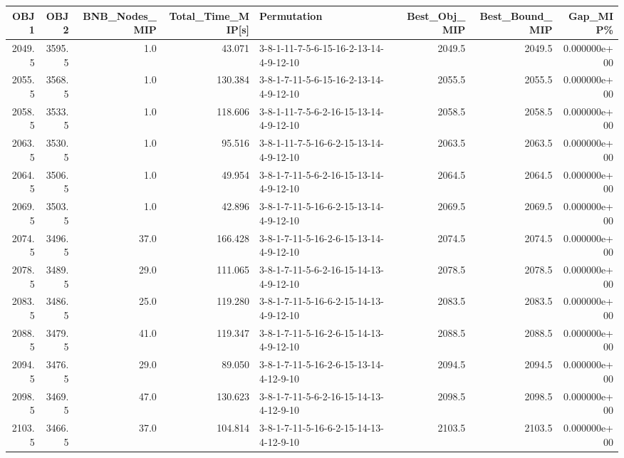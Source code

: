 \begin{tabular}{rrrrlrrr}
\toprule
   OBJ1 &    OBJ2 &  BNB\_Nodes\_MIP &  Total\_Time\_MIP[s] &                             Permutation &  Best\_Obj\_MIP &  Best\_Bound\_MIP &      Gap\_MIP\% \\
\midrule
 2049.5 &  3595.5 &            1.0 &             43.071 &  3-8-1-11-7-5-6-15-16-2-13-14-4-9-12-10 &        2049.5 &          2049.5 &  0.000000e+00 \\
 2055.5 &  3568.5 &            1.0 &            130.384 &  3-8-1-7-11-5-6-15-16-2-13-14-4-9-12-10 &        2055.5 &          2055.5 &  0.000000e+00 \\
 2058.5 &  3533.5 &            1.0 &            118.606 &  3-8-1-11-7-5-6-2-16-15-13-14-4-9-12-10 &        2058.5 &          2058.5 &  0.000000e+00 \\
 2063.5 &  3530.5 &            1.0 &             95.516 &  3-8-1-11-7-5-16-6-2-15-13-14-4-9-12-10 &        2063.5 &          2063.5 &  0.000000e+00 \\
 2064.5 &  3506.5 &            1.0 &             49.954 &  3-8-1-7-11-5-6-2-16-15-13-14-4-9-12-10 &        2064.5 &          2064.5 &  0.000000e+00 \\
 2069.5 &  3503.5 &            1.0 &             42.896 &  3-8-1-7-11-5-16-6-2-15-13-14-4-9-12-10 &        2069.5 &          2069.5 &  0.000000e+00 \\
 2074.5 &  3496.5 &           37.0 &            166.428 &  3-8-1-7-11-5-16-2-6-15-13-14-4-9-12-10 &        2074.5 &          2074.5 &  0.000000e+00 \\
 2078.5 &  3489.5 &           29.0 &            111.065 &  3-8-1-7-11-5-6-2-16-15-14-13-4-9-12-10 &        2078.5 &          2078.5 &  0.000000e+00 \\
 2083.5 &  3486.5 &           25.0 &            119.280 &  3-8-1-7-11-5-16-6-2-15-14-13-4-9-12-10 &        2083.5 &          2083.5 &  0.000000e+00 \\
 2088.5 &  3479.5 &           41.0 &            119.347 &  3-8-1-7-11-5-16-2-6-15-14-13-4-9-12-10 &        2088.5 &          2088.5 &  0.000000e+00 \\
 2094.5 &  3476.5 &           29.0 &             89.050 &  3-8-1-7-11-5-16-2-6-15-13-14-4-12-9-10 &        2094.5 &          2094.5 &  0.000000e+00 \\
 2098.5 &  3469.5 &           47.0 &            130.623 &  3-8-1-7-11-5-6-2-16-15-14-13-4-12-9-10 &        2098.5 &          2098.5 &  0.000000e+00 \\
 2103.5 &  3466.5 &           37.0 &            104.814 &  3-8-1-7-11-5-16-6-2-15-14-13-4-12-9-10 &        2103.5 &          2103.5 &  0.000000e+00 \\

\end{tabular}
